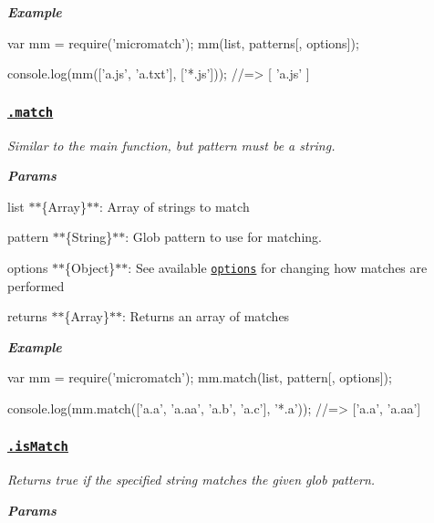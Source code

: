 {\itshape {\bfseries Example}}

{\itshape 
\begin{DoxyCode}
var mm = require('micromatch');
mm(list, patterns[, options]);

console.log(mm(['a.js', 'a.txt'], ['*.js']));
//=> [ 'a.js' ]
\end{DoxyCode}
}

{\itshape \subsubsection*{\href{index.js#L93}{\tt .match}}}

{\itshape }

{\itshape Similar to the main function, but {\ttfamily pattern} must be a string.}

{\itshape {\bfseries Params}}

{\itshape 
\begin{DoxyItemize}
\item {\ttfamily list} $\ast$$\ast$\{Array\}$\ast$$\ast$\+: Array of strings to match
\item {\ttfamily pattern} $\ast$$\ast$\{String\}$\ast$$\ast$\+: Glob pattern to use for matching.
\item {\ttfamily options} $\ast$$\ast$\{Object\}$\ast$$\ast$\+: See available \href{#options}{\tt options} for changing how matches are performed
\item {\ttfamily returns} $\ast$$\ast$\{Array\}$\ast$$\ast$\+: Returns an array of matches
\end{DoxyItemize}}

{\itshape {\bfseries Example}}

{\itshape 
\begin{DoxyCode}
var mm = require('micromatch');
mm.match(list, pattern[, options]);

console.log(mm.match(['a.a', 'a.aa', 'a.b', 'a.c'], '*.a'));
//=> ['a.a', 'a.aa']
\end{DoxyCode}
}

{\itshape \subsubsection*{\href{index.js#L154}{\tt .is\+Match}}}

{\itshape }

{\itshape Returns true if the specified {\ttfamily string} matches the given glob {\ttfamily pattern}.}

{\itshape {\bfseries Params}}

